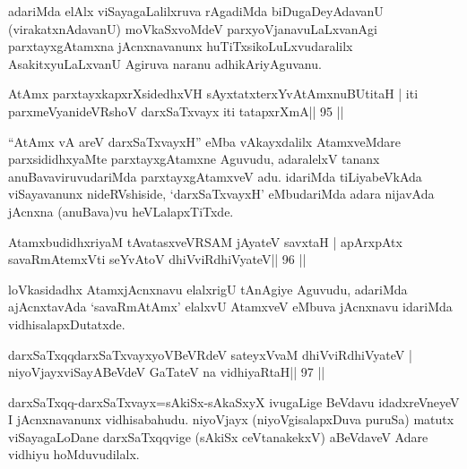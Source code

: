 \begin{artha}
adariMda elAlx viSayagaLalilxruva rAgadiMda biDugaDeyAdavanU (virakatxnAdavanU) moVkaSxvoMdeV parxyoVjanavuLaLxvanAgi parxtayxgAtamxna jAcnxnavanunx huTiTxsikoLuLxvudaralilx AsakitxyuLaLxvanU Agiruva naranu adhikAriyAguvanu.
\end{artha}

\begin{shl}
AtAmx parxtayxkapxrXsidedhxVH sAyxtatxterxYvA\s\s tAmxnuBUtitaH |
iti parxmeVyanideVRshoV darxSaTxvayx iti tatapxrXmA\hfill || 95 ||
\end{shl}

\begin{artha}
``AtAmx vA areV darxSaTxvayxH'' eMba vAkayxdalilx AtamxveMdare parxsididhxyaMte parxtayxgAtamxne Aguvudu, adaralelxV tananx anuBavaviruvudariMda parxtayxgAtamxveV adu. idariMda tiLiyabeVkAda viSayavanunx nideRVshiside, `darxSaTxvayxH' eMbudariMda adara nijavAda jAcnxna (anuBava)vu heVLalapxTiTxde.
\end{artha}


\begin{shl}
AtamxbudidhxriyaM tAvatasxveVRSAM jAyateV savxtaH |
apArxpAtx savaRmAtemxVti seYvAtoV dhiVviRdhiVyateV\hfill || 96 ||
\end{shl}

\begin{artha}
loVkasidadhx AtamxjAcnxnavu elalxrigU tAnAgiye Aguvudu, adariMda ajAcnxtavAda `savaRmAtAmx' elalxvU AtamxveV eMbuva jAcnxnavu idariMda vidhisalapxDutatxde.
\end{artha}


\begin{shl}
darxSaTxqqdarxSaTxvayxyoVBeVRdeV sateyxVvaM dhiVviRdhiVyateV |
niyoVjayxviSayABeVdeV GaTateV na vidhiyaRtaH\hfill || 97 ||
\end{shl}

\begin{artha}
darxSaTxqq-darxSaTxvayx=sAkiSx-sAkaSxyX ivugaLige BeVdavu
idadxreVneyeV I jAcnxnavanunx vidhisabahudu. niyoVjayx
(niyoVgisalapxDuva puruSa) matutx viSayagaLoDane darxSaTxqqvige
(sAkiSx ceVtanakekxV) aBeVdaveV Adare vidhiyu hoMduvudilalx. 
\end{artha}


